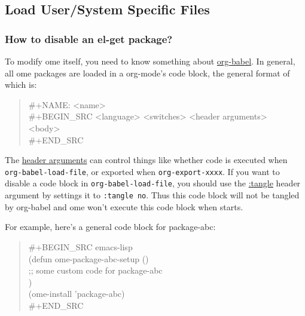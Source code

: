\documentclass[11pt]{article}
\begin{document}
\subsection*{Load User/System Specific Files}
\label{sec-4-1}
\subsubsection*{How to disable an el-get package?}
\label{sec-4-1-1}

To modify ome itself, you need to know something about \href{http://orgmode.org/worg/org-contrib/babel/intro.html#literate-programming}{org-babel}. In general,
all ome packages are loaded in a org-mode's code block, the general format of
which is:

\begin{verse}
\#+NAME: <name> \\
\#+BEGIN\_SRC <language> <switches> <header arguments> \\
\hspace*{7em}<body> \\
\#+END\_SRC \\
\end{verse}

The \href{http://orgmode.org/manual/Header-arguments.html#Header-arguments}{header arguments} can control things like whether code is executed when
\texttt{org-babel-load-file}, or exported when \texttt{org-export-xxxx}. If you want to
disable a code block in \texttt{org-babel-load-file}, you should use the \href{http://orgmode.org/manual/tangle.html#tangle}{:tangle}
header argument by settings it to \texttt{:tangle no}. Thus this code block will not
be tangled by org-babel and ome won't execute this code block when starts.

For example, here's a general code block for package-abc:

\begin{verse}
\#+BEGIN\_SRC emacs-lisp \\
(defun ome-package-abc-setup () \\
\hspace*{2em};; some custom code for package-abc \\
\hspace*{2em}) \\
\vspace*{1em}
(ome-install 'package-abc) \\
\#+END\_SRC \\
\end{verse}
\end{document}
